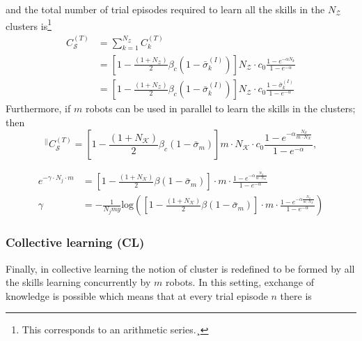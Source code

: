 and the total number of trial episodes required to learn all the skills in the $N_\mathcal{Z}$ clusters is\footnote{This corresponds to an arithmetic series.¸}
\begin{align}\label{eq:complexity_transfer_single}
	C_\mathcal{S}^{(T)} &= \sum_{k=1}^{N_\mathcal{Z}} C_{k}^{(T)}\\
	&= \left[1 - \frac{\left(1+N_\mathcal{Z}\right)}{2}\beta_c \left(1-\bar{\sigma}^{(I)}_k\right)\right] N_\mathcal{Z} \cdot  c_0 \frac{1 - e^{-\alpha N_k}}{1 - e^{-\alpha}}\\
	&= \left[1 - \frac{\left(1+N_\mathcal{Z}\right)}{2}\beta_c \left(1-\bar{\sigma}^{(I)}_k\right)\right] N_\mathcal{Z} \cdot  c_0 \frac{1 - \bar{\sigma}^{(I)}_k}{1 - e^{-\alpha}}	
\end{align}
Furthermore, if $ m $ robots can be used in parallel to learn the skills in the clusters; then
\begin{equation}\label{eq:complexity_transfer_parallel}
	{}^{\lvert \lvert}C_\mathcal{S}^{(T)} = \left[1 - \frac{\left(1+N_\mathcal{K}\right)}{2}\beta_c \left(1-\bar{\sigma}_m\right)\right] m \cdot N_\mathcal{K}  \cdot c_0 \frac{1 - e^{-\alpha \frac{N_\mathcal{S}}{m \cdot N_\mathcal{K}}}}{1 - e^{-\alpha}},
\end{equation}

\begin{tcolorbox}
	\begin{align}
		e^{-\gamma \cdot N_j \cdot m}  &= \left[1 - \frac{\left(1+N_\mathcal{K}\right)}{2}\beta \left(1-\bar{\sigma}_m\right)\right]  \cdot m \cdot \frac{1 - e^{-\alpha \frac{N_\mathcal{S}}{m \cdot N_\mathcal{K}}}}{1 - e^{-\alpha}}\\
		\gamma &= -\frac{1}{N_j my}\text{log} \left( \left[1 - \frac{\left(1+N_\mathcal{K}\right)}{2}\beta \left(1-\bar{\sigma}_m\right)\right]  \cdot m \cdot \frac{1 - e^{-\alpha \frac{N_\mathcal{S}}{m \cdot N_\mathcal{K}}}}{1 - e^{-\alpha}}\right)
	\end{align}
\end{tcolorbox}
\subsubsection{\textbf{Collective learning (CL)}}
Finally, in collective learning the notion of cluster is redefined to be formed by all the skills learning concurrently by $m$ robots. In this setting, exchange of knowledge is possible which means that at every trial episode $n$ there is 

